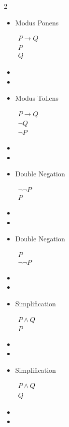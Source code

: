 \documentclass{article}
\begin{document}
	\begin{multicols}{2}

		\begin{itemize}
			\item Modus Ponens

			$\begin{array}{l}
				 P\rightarrow Q\\
				 P\\\hline
				 Q
			\end{array}$
			\item[]
			\item[]

			\item Modus Tollens

			$\begin{array}{l}
				 P\rightarrow Q\\
				 \neg Q\\\hline
				 \neg P
			\end{array}$
			\item[]
			\item[]

			\item Double Negation

			$\begin{array}{l}
				 \neg \neg P\\\hline
				 P
			\end{array}$
			\item[]
			\item[]

			\item Double Negation

			$\begin{array}{l}
				 P\\\hline
				 \neg \neg P
			\end{array}$
			\item[]
			\item[]

			\item Simplification

			$\begin{array}{l}
				 P\wedge Q\\\hline
				 P
			\end{array}$
			\item[]
			\item[]


			\item Simplification

			$\begin{array}{l}
				 P\wedge Q\\\hline
				 Q
			\end{array}$
			\item[]
			\item[]


\end{itemize}
\end{multicols}
\end{document}
